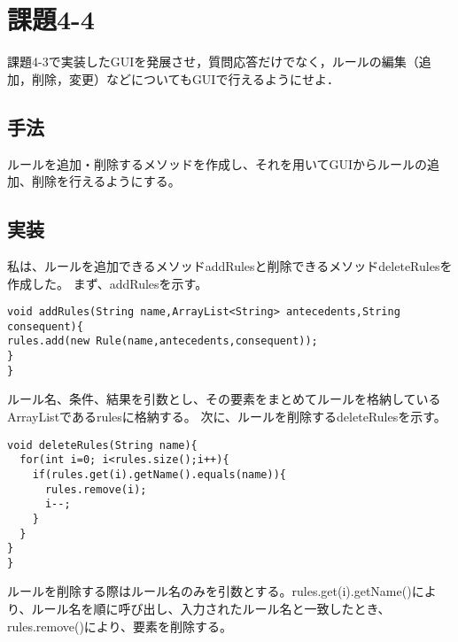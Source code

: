 \documentclass[a4j]{jarticle}
\begin{document}
\section{課題4-4}
\begin{screen}
課題4-3で実装したGUIを発展させ，質問応答だけでなく，ルールの編集（追加，削除，変更）などについてもGUIで行えるようにせよ．
\end{screen}

\subsection{手法}
ルールを追加・削除するメソッドを作成し、それを用いてGUIからルールの追加、削除を行えるようにする。
\subsection{実装}
私は、ルールを追加できるメソッドaddRulesと削除できるメソッドdeleteRulesを作成した。
まず、addRulesを示す。
\begin{lstlisting}[caption=addRulesメソッド]
void addRules(String name,ArrayList<String> antecedents,String consequent){
rules.add(new Rule(name,antecedents,consequent));
}
}
\end{lstlisting}
ルール名、条件、結果を引数とし、その要素をまとめてルールを格納しているArrayListであるrulesに格納する。
次に、ルールを削除するdeleteRulesを示す。
\begin{lstlisting}[caption=deleteRulesメソッド]
void deleteRules(String name){
  for(int i=0; i<rules.size();i++){
    if(rules.get(i).getName().equals(name)){
      rules.remove(i);
      i--;
    }
  }
}
}
\end{lstlisting}
ルールを削除する際はルール名のみを引数とする。rules.get(i).getName()により、ルール名を順に呼び出し、入力されたルール名と一致したとき、rules.remove()により、要素を削除する。
\end{document}
